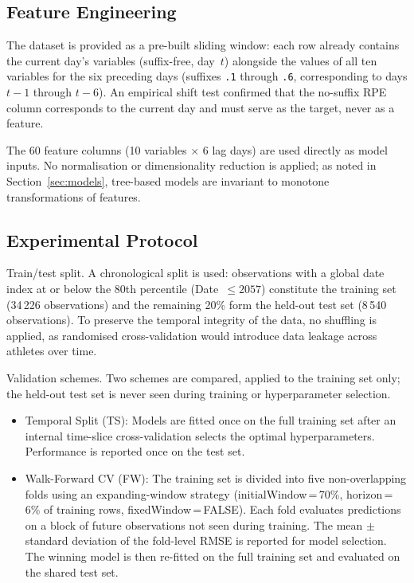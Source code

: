 \documentclass[10pt, twocolumn]{article}
\begin{document}
\subsection{Feature Engineering}
\label{subsec:features}

The dataset is provided as a pre-built sliding window: each row already
contains the current day's variables (suffix-free, day~$t$) alongside the
values of all ten variables for the six preceding days (suffixes \texttt{.1}
through \texttt{.6}, corresponding to days $t-1$ through $t-6$). An
empirical shift test confirmed that the no-suffix RPE column corresponds
to the current day and must serve as the target, never as a feature.

The 60 feature columns (10 variables $\times$ 6 lag days) are used directly
as model inputs. No normalisation or dimensionality reduction is applied;
as noted in Section~\ref{sec:models}, tree-based models are invariant to
monotone transformations of features.

\subsection{Experimental Protocol}
\label{subsec:protocol}

Train/test split.
A chronological split is used: observations with a global date index at or
below the 80th percentile (Date~$\leq 2057$) constitute the training set
(34\,226 observations) and the remaining 20\% form the held-out test set
(8\,540 observations). To preserve the temporal integrity of the data,
no shuffling is applied, as randomised cross-validation would introduce
data leakage across athletes over time.

Validation schemes.
Two schemes are compared, applied to the training set only; the held-out
test set is never seen during training or hyperparameter selection.

\begin{itemize}
  \item Temporal Split (TS): Models are fitted once on the full
    training set after an internal time-slice cross-validation selects the
    optimal hyperparameters. Performance is reported once on the test set.
  \item Walk-Forward CV (FW): The training set is divided into five
    non-overlapping folds using an expanding-window strategy
    (initialWindow\,=\,70\%, horizon\,=\,6\% of training rows,
    fixedWindow\,=\,FALSE). Each fold evaluates predictions on a block of
    future observations not seen during training. The mean $\pm$ standard
    deviation of the fold-level RMSE is reported for model selection.
    The winning model is then re-fitted on the full training set and
    evaluated on the shared test set.
\end{itemize}
\end{document}
